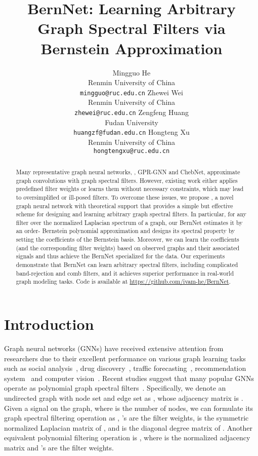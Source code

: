 \documentclass{article}
\title{BernNet: Learning Arbitrary Graph Spectral Filters via Bernstein Approximation}
\author{Mingguo He \\
  Renmin University of China\\
  \texttt{mingguo@ruc.edu.cn}
  \And
  Zhewei Wei\footnotemark[1] \\
  Renmin University of China\\
  \texttt{zhewei@ruc.edu.cn}
  \AND
  Zengfeng Huang\\
  Fudan University\\
  \texttt{huangzf@fudan.edu.cn}
  \And
  Hongteng Xu\footnotemark[1]\\
  Renmin University of China\\
  \texttt{hongtengxu@ruc.edu.cn}
}
\begin{document}
\maketitle
\renewcommand{\thefootnote}{\fnsymbol{footnote}}

\begin{abstract}
Many representative graph neural networks, , GPR-GNN and ChebNet, approximate graph convolutions with graph spectral filters. 
However, existing work either applies predefined filter weights or learns them without necessary constraints, which may lead to oversimplified or ill-posed filters. 
To overcome these issues, we propose , a novel graph neural network with theoretical support that provides a simple but effective scheme for designing and learning arbitrary graph spectral filters.
In particular, for any filter over the normalized Laplacian spectrum of a graph, our BernNet estimates it by an order- Bernstein polynomial approximation and designs its spectral property by setting the coefficients of the Bernstein basis. 
Moreover, we can learn the coefficients (and the corresponding filter weights) based on observed graphs and their associated signals and thus achieve the BernNet specialized for the data. 
Our experiments demonstrate that BernNet can learn arbitrary spectral filters, including complicated band-rejection and comb filters, and it achieves superior performance in real-world graph modeling tasks. Code is available at \url{https://github.com/ivam-he/BernNet}.
\end{abstract}


\section{Introduction}\label{sec_intro}
Graph neural networks (GNNs) have received extensive attention from researchers due to their excellent performance on various graph learning tasks such as social analysis~\cite{qiu2018deepinf,li2019encoding,tong2019leveraging}, drug discovery~\cite{jiang2021could,rathi2019practical}, traffic forecasting~\cite{li2017diffusion,bogaerts2020graph,cui2019traffic}, recommendation system~\cite{ying2018graph,wu2019session} and computer vision~\cite{zhao2019semantic,chen2019multi}. 
Recent studies suggest that many popular GNNs operate as polynomial graph spectral filters~\cite{Chebnet,kipf2016semi,chien2021GPR-GNN,levie2018cayleynets,bianchi2021ARMA,xu2018graphWavelet}. 
Specifically, we denote an undirected graph with node set  and edge set  as , whose adjacency matrix is . 
Given a signal  on the graph, where  is the number of nodes, we can formulate its graph spectral filtering operation as , 's are the filter weights,   is the symmetric normalized Laplacian matrix of , and  is the diagonal degree matrix of . Another equivalent polynomial filtering operation is , where  is the normalized adjacency matrix and 's are the filter weights.
\end{document}
